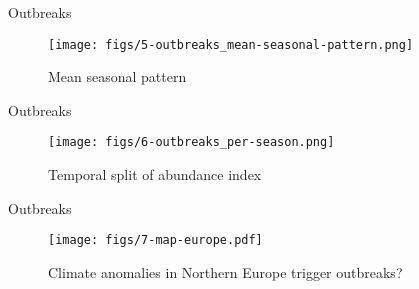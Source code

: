 \documentclass[english, xcolor=dvipsnames, 11pt]{beamer}
\begin{document}
	
	\begin{frame}{Outbreaks}
		\begin{figure}
			\centering
			\texttt{[image: figs/5-outbreaks\_mean-seasonal-pattern.png]}
			\caption{Mean seasonal pattern}
			\label{fig:seasonal-pattern}
		\end{figure}
	\end{frame}

	
	\begin{frame}{Outbreaks}
		\begin{figure}
			\centering
			\texttt{[image: figs/6-outbreaks\_per-season.png]}
			\caption{Temporal split of abundance index}
			\label{fig:outbreaks-by-season}
		\end{figure}
	\end{frame}
	
	
	\begin{frame}{Outbreaks}
		\begin{figure}
			\centering
			\texttt{[image: figs/7-map-europe.pdf]}
			\caption{Climate anomalies in Northern Europe trigger outbreaks?}
			\label{fig:map-europe}
		\end{figure}
	\end{frame}
	
	
	\begin{frame}[allowframebreaks]
		\printbibliography
	\end{frame}
	
	\maketitle
	
\end{document}
